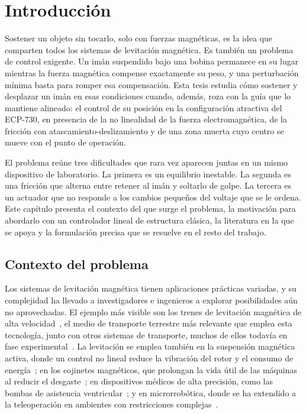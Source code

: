 \chapter{Introducción}\label{chap:introduccion}

Sostener un objeto sin tocarlo, solo con fuerzas magnéticas, es la idea que comparten todos los sistemas de levitación magnética. Es también un problema de control exigente. Un imán suspendido bajo una bobina permanece en su lugar mientras la fuerza magnética compense exactamente su peso, y una perturbación mínima basta para romper esa compensación. Esta tesis estudia cómo sostener y desplazar un imán en esas condiciones cuando, además, roza con la guía que lo mantiene alineado: el control de su posición en la configuración atractiva del ECP-730, en presencia de la no linealidad de la fuerza electromagnética, de la fricción con atascamiento-deslizamiento y de una zona muerta cuyo centro se mueve con el punto de operación.

El problema reúne tres dificultades que rara vez aparecen juntas en un mismo dispositivo de laboratorio. La primera es un equilibrio inestable. La segunda es una fricción que alterna entre retener al imán y soltarlo de golpe. La tercera es un actuador que no responde a los cambios pequeños del voltaje que se le ordena. Este capítulo presenta el contexto del que surge el problema, la motivación para abordarlo con un controlador lineal de estructura clásica, la literatura en la que se apoya y la formulación precisa que se resuelve en el resto del trabajo.

\section{Contexto del problema}

Los sistemas de levitación magnética tienen aplicaciones prácticas variadas, y su complejidad ha llevado a investigadores e ingenieros a explorar posibilidades aún no aprovechadas. El ejemplo más visible son los trenes de levitación magnética de alta velocidad~\cite{mingda}, el medio de transporte terrestre más relevante que emplea esta tecnología, junto con otros sistemas de transporte, muchos de ellos todavía en fase experimental~\cite{hyung}. La levitación se emplea también en la suspensión magnética activa, donde un control no lineal reduce la vibración del rotor y el consumo de energía~\cite{charara}; en los cojinetes magnéticos, que prolongan la vida útil de las máquinas al reducir el desgaste~\cite{debarghya}; en dispositivos médicos de alta precisión, como las bombas de asistencia ventricular~\cite{gang1}; y en microrrobótica, donde se ha extendido a la teleoperación en ambientes con restricciones complejas~\cite{mir}.

